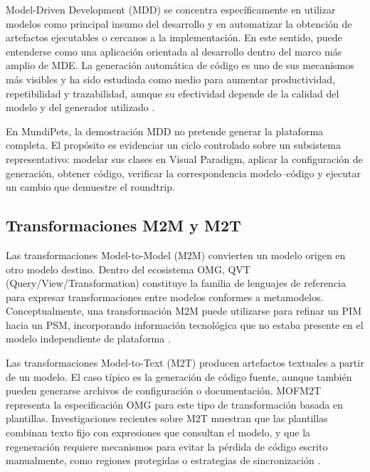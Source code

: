 \documentclass[journal,onecolumn]{IEEEtran}
\begin{document}
	Model-Driven Development (MDD) se concentra específicamente en utilizar modelos como principal insumo del desarrollo y en automatizar la obtención de artefactos ejecutables o cercanos a la implementación. En este sentido, puede entenderse como una aplicación orientada al desarrollo dentro del marco más amplio de MDE. La generación automática de código es uno de sus mecanismos más visibles y ha sido estudiada como medio para aumentar productividad, repetibilidad y trazabilidad, aunque su efectividad depende de la calidad del modelo y del generador utilizado \cite{sebastian2020codegen, krouwel2024enterprise}.
	
	En MundiPets, la demostración MDD no pretende generar la plataforma completa. El propósito es evidenciar un ciclo controlado sobre un subsistema representativo: modelar sus clases en Visual Paradigm, aplicar la configuración de generación, obtener código, verificar la correspondencia modelo--código y ejecutar un cambio que demuestre el roundtrip.
	
	\subsection{Transformaciones M2M y M2T}
	
	Las transformaciones Model-to-Model (M2M) convierten un modelo origen en otro modelo destino. Dentro del ecosistema OMG, QVT (Query/View/Transformation) constituye la familia de lenguajes de referencia para expresar transformaciones entre modelos conformes a metamodelos. Conceptualmente, una transformación M2M puede utilizarse para refinar un PIM hacia un PSM, incorporando información tecnológica que no estaba presente en el modelo independiente de plataforma \cite{silega2022cimpim}.
	
	Las transformaciones Model-to-Text (M2T) producen artefactos textuales a partir de un modelo. El caso típico es la generación de código fuente, aunque también pueden generarse archivos de configuración o documentación. MOFM2T representa la especificación OMG para este tipo de transformación basada en plantillas. Investigaciones recientes sobre M2T muestran que las plantillas combinan texto fijo con expresiones que consultan el modelo, y que la regeneración requiere mecanismos para evitar la pérdida de código escrito manualmente, como regiones protegidas o estrategias de sincronización \cite{almutairi2022roundtrip}.
	
\end{document}
